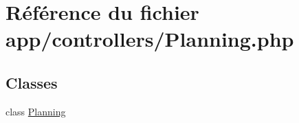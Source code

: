 \hypertarget{_planning_8php}{}\section{Référence du fichier app/controllers/\+Planning.php}
\label{_planning_8php}
\subsection*{Classes}
\begin{DoxyCompactItemize}
\item 
class \hyperlink{class_planning}{Planning}
\end{DoxyCompactItemize}
